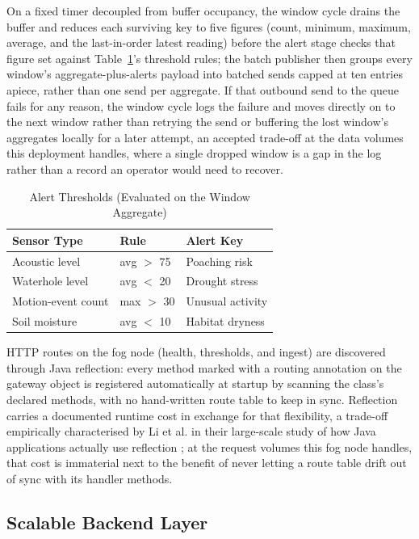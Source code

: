 \documentclass[conference,a4paper]{IEEEtran}
\begin{document}
On a fixed timer decoupled from buffer occupancy, the window cycle drains the buffer and reduces each surviving key to five figures (count, minimum, maximum, average, and the last-in-order latest reading) before the alert stage checks that figure set against Table~\ref{tab:thresholds}'s threshold rules; the batch publisher then groups every window's aggregate-plus-alerts payload into batched sends capped at ten entries apiece, rather than one send per aggregate. If that outbound send to the queue fails for any reason, the window cycle logs the failure and moves directly on to the next window rather than retrying the send or buffering the lost window's aggregates locally for a later attempt, an accepted trade-off at the data volumes this deployment handles, where a single dropped window is a gap in the log rather than a record an operator would need to recover.

\begin{table}[!t]
\caption{Alert Thresholds (Evaluated on the Window Aggregate)}
\label{tab:thresholds}
\centering\scriptsize
\setlength{\tabcolsep}{2pt}
\begin{tabular}{p{1.46in}p{0.48in}p{1.29in}}
\hline
\textbf{Sensor Type} & \textbf{Rule} & \textbf{Alert Key} \\
\hline
Acoustic level & avg $>$ 75 & Poaching risk \\
Waterhole level & avg $<$ 20 & Drought stress \\
Motion-event count & max $>$ 30 & Unusual activity \\
Soil moisture & avg $<$ 10 & Habitat dryness \\
\hline
\end{tabular}
\end{table}

HTTP routes on the fog node (health, thresholds, and ingest) are discovered through Java reflection: every method marked with a routing annotation on the gateway object is registered automatically at startup by scanning the class's declared methods, with no hand-written route table to keep in sync. Reflection carries a documented runtime cost in exchange for that flexibility, a trade-off empirically characterised by Li et al. in their large-scale study of how Java applications actually use reflection \cite{ref5}; at the request volumes this fog node handles, that cost is immaterial next to the benefit of never letting a route table drift out of sync with its handler methods.

\subsection{Scalable Backend Layer}
\end{document}
